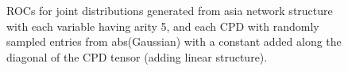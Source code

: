 \documentclass{article} %
\newlength{\subfigheight}
\begin{document}
\begin{figure}[h]
\centering
\caption{ROCs for joint distributions generated from asia network structure with each variable having arity 5, and each CPD with randomly sampled entries from abs(Gaussian) with a constant added along the diagonal of the CPD tensor (adding linear structure).}
\end{figure}
\end{document}
